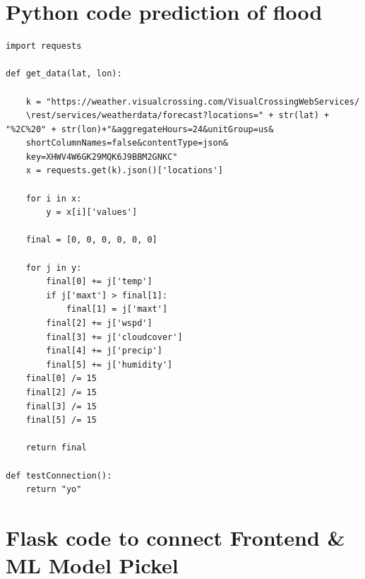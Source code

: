\documentclass[a4paper,12pt]{report}
\begin{document}
\section{Python code prediction of flood}

\begin{lstlisting}
import requests

def get_data(lat, lon):

    k = "https://weather.visualcrossing.com/VisualCrossingWebServices/
    \rest/services/weatherdata/forecast?locations=" + str(lat) + "%2C%20" + str(lon)+"&aggregateHours=24&unitGroup=us&
    shortColumnNames=false&contentType=json&
    key=XHWV4W6GK29MQK6J9BBM2GNKC"
    x = requests.get(k).json()['locations']

    for i in x:
        y = x[i]['values']

    final = [0, 0, 0, 0, 0, 0]

    for j in y:
        final[0] += j['temp']
        if j['maxt'] > final[1]:
            final[1] = j['maxt']
        final[2] += j['wspd']
        final[3] += j['cloudcover']
        final[4] += j['precip']
        final[5] += j['humidity']
    final[0] /= 15
    final[2] /= 15
    final[3] /= 15
    final[5] /= 15
    
    return final

def testConnection():
    return "yo"    
\end{lstlisting}

\section{Flask code to connect Frontend \& ML Model Pickel}
\end{document}
